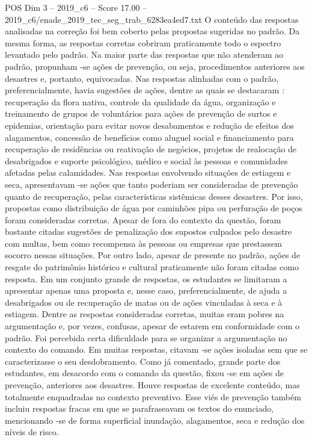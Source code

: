 \begin{textsample}{POS Dim 3 – 2019\_c6 – Score 17.00 – 2019\_c6/enade\_2019\_tec\_seg\_trab\_6283ea4ed7.txt}
O conteúdo das respostas analisadas na correção foi bem coberto pelas propostas sugeridas no padrão.
Da mesma forma, as respostas corretas cobriram praticamente todo o espectro levantado pelo padrão.
Na maior parte das respostas que não atenderam ao padrão, propunham -se ações de prevenção, ou seja, procedimentos anteriores aos desastres e, portanto, equivocadas.
Nas respostas alinhadas com o padrão, preferencialmente, havia sugestões de ações, dentre as quais se destacaram : recuperação da flora nativa, controle da qualidade da água, organização e treinamento de grupos de voluntários para ações de prevenção de surtos e epidemias, orientação para evitar novos desabamentos e redução de efeitos dos alagamentos, concessão de benefícios como aluguel social e financiamento para recuperação de residências ou reativação de negócios, projetos de realocação de desabrigados e suporte psicológico, médico e social às pessoas e comunidades afetadas pelas calamidades.
Nas respostas envolvendo situações de estiagem e seca, apresentavam -se ações que tanto poderiam ser consideradas de prevenção quanto de recuperação, pelas características sistêmicas desses desastres.
Por isso, propostas como distribuição de água por caminhões pipa ou perfuração de poços foram consideradas corretas.
Apesar de fora do contexto da questão, foram bastante citadas sugestões de penalização dos supostos culpados pelo desastre com multas, bem como recompensa às pessoas ou empresas que prestassem socorro nessas situações.
Por outro lado, apesar de presente no padrão, ações de resgate do patrimônio histórico e cultural praticamente não foram citadas como resposta.
Em um conjunto grande de respostas, os estudantes se limitaram a apresentar apenas uma proposta e, nesse caso, preferencialmente, de ajuda a desabrigados ou de recuperação de matas ou de ações vinculadas à seca e à estiagem.
Dentre as respostas consideradas corretas, muitas eram pobres na argumentação e, por vezes, confusas, apesar de estarem em conformidade com o padrão.
Foi percebida certa dificuldade para se organizar a argumentação no contexto do comando.
Em muitas respostas, citavam -se ações isoladas sem que se caracterizasse o seu desdobramento.
Como já comentado, grande parte dos estudantes, em desacordo com o comando da questão, fixou -se em ações de prevenção, anteriores aos desastres.
Houve respostas de excelente conteúdo, mas totalmente enquadradas no contexto preventivo.
Esse viés de prevenção também incluiu respostas fracas em que se parafraseavam os textos do enunciado, mencionando -se de forma superficial inundação, alagamentos, seca e redução dos níveis de risco.

\end{textsample}
